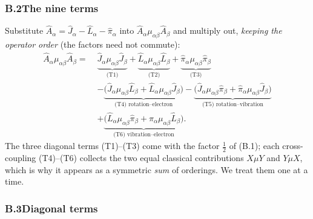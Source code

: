 \subsubsection*{B.2\quad The nine terms}

Substitute $\hat A_\alpha=\hat J_\alpha-\hat L_\alpha-\hat\pi_\alpha$ into $\hat A_\alpha\mu_{\alpha\beta}\hat A_\beta$ and multiply out, \emph{keeping the operator order} (the factors need not commute):
\begin{align}
\hat A_\alpha\mu_{\alpha\beta}\hat A_\beta
=\;&\underbrace{\hat J_\alpha\mu_{\alpha\beta}\hat J_\beta}_{\text{(T1)}}
+\underbrace{\hat L_\alpha\mu_{\alpha\beta}\hat L_\beta}_{\text{(T2)}}
+\underbrace{\hat\pi_\alpha\mu_{\alpha\beta}\hat\pi_\beta}_{\text{(T3)}}\nonumber\\
&-\underbrace{\bigl(\hat J_\alpha\mu_{\alpha\beta}\hat L_\beta+\hat L_\alpha\mu_{\alpha\beta}\hat J_\beta\bigr)}_{\text{(T4) rotation--electron}}
-\underbrace{\bigl(\hat J_\alpha\mu_{\alpha\beta}\hat\pi_\beta+\hat\pi_\alpha\mu_{\alpha\beta}\hat J_\beta\bigr)}_{\text{(T5) rotation--vibration}}\nonumber\\
&+\underbrace{\bigl(\hat L_\alpha\mu_{\alpha\beta}\hat\pi_\beta+\hat\pi_\alpha\mu_{\alpha\beta}\hat L_\beta\bigr)}_{\text{(T6) vibration--electron}} . \tag{B.7}
\end{align}
The three diagonal terms (T1)--(T3) come with the factor $\tfrac12$ of (B.1); each cross-coupling (T4)--(T6) collects the two equal classical contributions $X\mu Y$ and $Y\mu X$, which is why it appears as a symmetric \emph{sum} of orderings. We treat them one at a time.

\subsubsection*{B.3\quad Diagonal terms}

